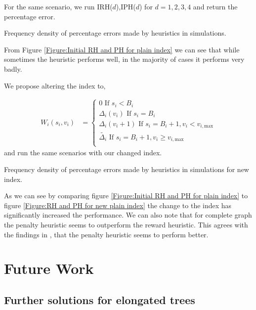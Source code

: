 \documentclass[a4paper,10pt]{article}
\theoremstyle{definition}
\theoremstyle{definition}
\theoremstyle{remark}
\theoremstyle{definition}
\begin{document}
For the same scenario, we run IRH($d$),IPH($d$) for $d=1,2,3,4$ and return the percentage error.

\begin{myfigure}

\caption{Frequency density of percentage errors made by heuristics in simulations.}
\label{Figure:Initial RH and PH for plain index}
\end{myfigure}

From Figure \ref{Figure:Initial RH and PH for plain index} we can see that while sometimes the heuristic performs well, in the majority of cases it performs very badly.

We propose altering the index to,

\begin{align}
W_{i}(s_{i},v_{i})&=\begin{cases}
0 \text{ If } s_{i}<B_{i} \\
\Delta_{i}(v_{i}) \text{ If } s_{i}=B_{i} \\
\Delta_{i}(v_{i}+1) \text{ If } s_{i}=B_{i}+1 , v_{i} < v_{i,\text{max}} \\
\widetilde{\Delta_{i}} \text{ If } s_{i}=B_{i}+1, v_{i} \geq v_{i,\text{max}} \\
\end{cases}
\end{align}
and run the same scenarios with our changed index.

\begin{myfigure}

\caption{Frequency density of percentage errors made by heuristics in simulations for new index.}
\label{Figure:RH and PH for new plain index}
\end{myfigure}

As we can see by comparing figure \ref{Figure:Initial RH and PH for plain index} to figure \ref{Figure:RH and PH for new plain index} the change to the index has significantly increased the performance. We can also note that for complete graph the penalty heuristic seems to outperform the reward heuristic. This agrees with the findings in \cite{Lin2013}, that the penalty heuristic seems to perform better.

\section{Future Work}
\label{Section:Future Work}

\subsection{Further solutions for elongated trees}
\label{Section:Further solutions for elongated trees}
\end{document}
